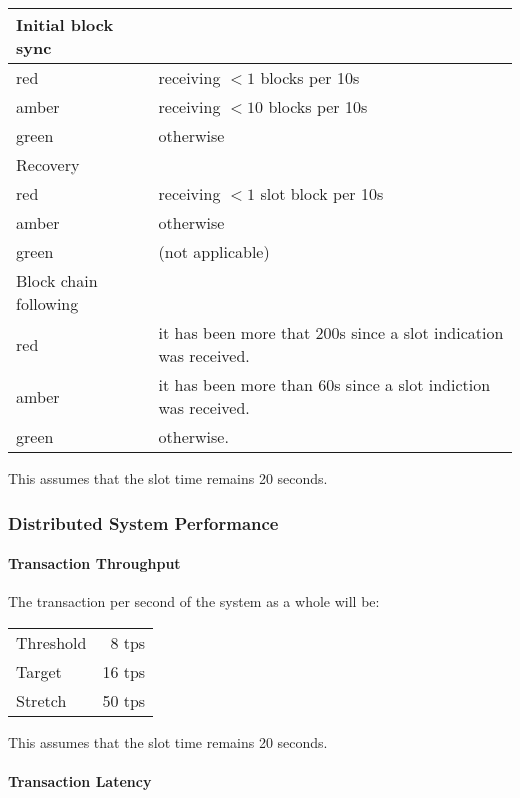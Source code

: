 \documentclass{report}
\theoremstyle{definition}{
  \newtheorem{lemma}{Lemma}[section] %
  \newtheorem{definition}[lemma]{Definition}
}
\theoremstyle{theorem}{
  \newtheorem{invariant}[lemma]{Invariant}
  \newtheorem{proofobligation}[lemma]{Proof Obligation}
}
\numberwithin{equation}{lemma}
\begin{document}
%
\begin{center}
\begin{tabular}{ll}
Initial block sync \\
\hline
red   & receiving $<1$ blocks per 10s \\
amber & receiving $<10$ blocks per 10s \\
green & otherwise  \\[1em]

Recovery \\
\hline
red   & receiving $<1$ slot block per 10s \\
amber & otherwise  \\
green & (not applicable) \\[1em]

Block chain following \\
\hline
red   & it has been more that 200s since a slot indication was received. \\
amber & it has been more than 60s since a slot indiction was received. \\
green & otherwise.
\end{tabular}
\end{center}

This assumes that the slot time remains 20 seconds.


\subsubsection{Distributed System Performance}

\paragraph{Transaction Throughput}

The transaction per second of the system as a whole will be:
%
\begin{center}
\begin{tabular}{lr}
Threshold &  8 tps  \\
Target    & 16 tps  \\
Stretch   & 50 tps  \\
\end{tabular}
\end{center}

This assumes that the slot time remains 20 seconds.

\paragraph{Transaction Latency}
\end{document}
